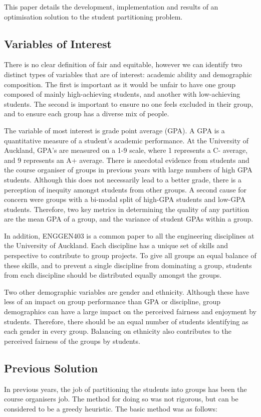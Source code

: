\documentclass[12pt]{ORSNZ}
\begin{document}
This paper details the development, implementation and results of an optimisation solution to the student partitioning problem. 

\subsection{Variables of Interest}
There is no clear definition of fair and equitable, however we can identify two distinct types of variables that are of interest: academic ability and demographic composition. The first is important as it would be unfair to have one group composed of mainly high-achieving students, and another with low-achieving students. The second is important to ensure no one feels excluded in their group, and to ensure each group has a diverse mix of people.

The variable of most interest is grade point average (GPA). A GPA is a quantitative measure of a student's academic performance. At the University of Auckland, GPA's are measured on a 1-9 scale, where 1 represents a C- average, and 9 represents an A+ average. There is anecdotal evidence from students and the course organiser of groups in previous years with large numbers of high GPA students. Although this does not necessarily lead to a better grade, there is a perception of inequity amongst students from other groups. A second cause for concern were groups with a bi-modal split of high-GPA students and low-GPA students. Therefore, two key metrics in determining the quality of any partition are the mean GPA of a group, and the variance of student GPAs within a group.

In addition, ENGGEN403 is a common paper to all the engineering disciplines at the University of Auckland. Each discipline has a unique set of skills and perspective to contribute to group projects. To give all groups an equal balance of these skills, and to prevent a single discipline from dominating a group, students from each discipline should be distributed equally amongst the groups.

Two other demographic variables are gender and ethnicity. Although these have less of an impact on group performance than GPA or discipline, group demographics can have a large impact on the perceived fairness and enjoyment by students. Therefore, there should be an equal number of students identifying as each gender in every group. Balancing on ethnicity also contributes to the perceived fairness of the groups by students.

\subsection{Previous Solution}
In previous years, the job of partitioning the students into groups has been the course organisers job. The method for doing so was not rigorous, but can be considered to be a greedy heuristic. The basic method was as follows:
\end{document}
